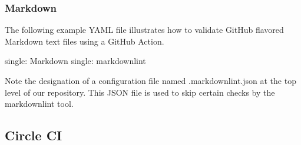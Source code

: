 \hypertarget{markdown}{%
\subsubsection{Markdown}\label{markdown}}

The following example YAML file illustrates how to validate GitHub
flavored Markdown text files using a GitHub Action.

single: Markdown single: markdownlint

\begin{Shaded}
\begin{Highlighting}[]
    \AttributeTok{ }\KeywordTok{[}\KeywordTok{]}
    \AttributeTok{ }\KeywordTok{[}\KeywordTok{]}
    \KeywordTok{-} 
    \KeywordTok{-} 
      \AttributeTok{ }
\end{Highlighting}
\end{Shaded}

Note the designation of a configuration file named .markdownlint.json at
the top level of our repository. This JSON file is used to skip certain
checks by the markdownlint tool.

\begin{Shaded}
\begin{Highlighting}[]
\FunctionTok{\{}
    \FunctionTok{:} \FunctionTok{,}
    \FunctionTok{:} \FunctionTok{,}
    \FunctionTok{:} \FunctionTok{,}
    \FunctionTok{:} \FunctionTok{,}
    \FunctionTok{:} 
\FunctionTok{\}}
\end{Highlighting}
\end{Shaded}

\hypertarget{circle-ci}{%
\subsection{Circle CI}\label{circle-ci}}


